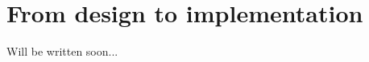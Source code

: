 \chapter[From design to implementation]{From design to implementation}
\label{chap:from_design_to_implementation}


Will be written soon...
